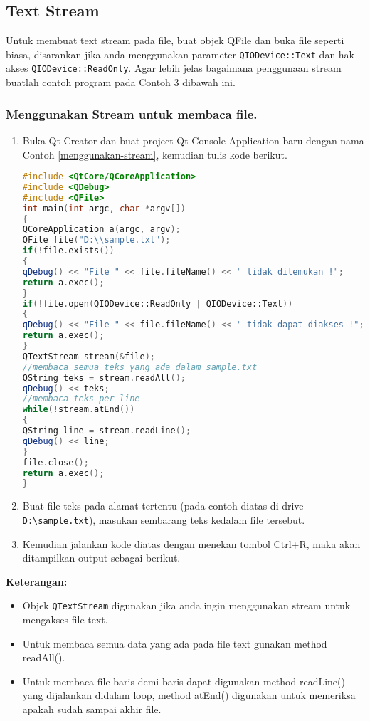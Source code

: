 \subsection{Text Stream}\label{text-stream}

Untuk membuat text stream pada file, buat objek QFile dan buka file
seperti biasa, disarankan jika anda menggunakan parameter
\texttt{QIODevice::Text} dan hak akses \texttt{QIODevice::ReadOnly}.
Agar lebih jelas bagaimana penggunaan stream buatlah contoh program pada
Contoh 3 dibawah ini.

\subsubsection*{Menggunakan Stream untuk membaca file.}

\begin{enumerate}

\item
  Buka Qt Creator dan buat project Qt Console Application baru dengan
  nama Contoh \ref{menggunakan-stream}, kemudian tulis kode berikut.

\begin{lstlisting}[language=c++, caption=Menggunakan Stream untuk membaca file, label=menggunakan-stream]
#include <QtCore/QCoreApplication>
#include <QDebug>
#include <QFile>
int main(int argc, char *argv[])
{
QCoreApplication a(argc, argv);
QFile file("D:\\sample.txt");
if(!file.exists())
{
qDebug() << "File " << file.fileName() << " tidak ditemukan !";
return a.exec();
}
if(!file.open(QIODevice::ReadOnly | QIODevice::Text))
{
qDebug() << "File " << file.fileName() << " tidak dapat diakses !";
return a.exec();
}
QTextStream stream(&file);
//membaca semua teks yang ada dalam sample.txt
QString teks = stream.readAll();
qDebug() << teks;
//membaca teks per line
while(!stream.atEnd())
{
QString line = stream.readLine();
qDebug() << line;
}
file.close();
return a.exec();
}
\end{lstlisting}
\item
  Buat file teks pada alamat tertentu (pada contoh diatas di drive
  \texttt{D:\textbackslash{}sample.txt}), masukan sembarang teks kedalam
  file tersebut.
\item
  Kemudian jalankan kode diatas dengan menekan tombol Ctrl+R, maka akan
  ditampilkan output sebagai berikut.
\end{enumerate}

\textbf{Keterangan:}

\begin{itemize}

\item
  Objek \texttt{QTextStream} digunakan jika anda ingin menggunakan
  stream untuk mengakses file text.
\item
  Untuk membaca semua data yang ada pada file text gunakan method
  readAll().
\item
  Untuk membaca file baris demi baris dapat digunakan method readLine()
  yang dijalankan didalam loop, method atEnd() digunakan untuk memeriksa
  apakah sudah sampai akhir file.
\end{itemize}

